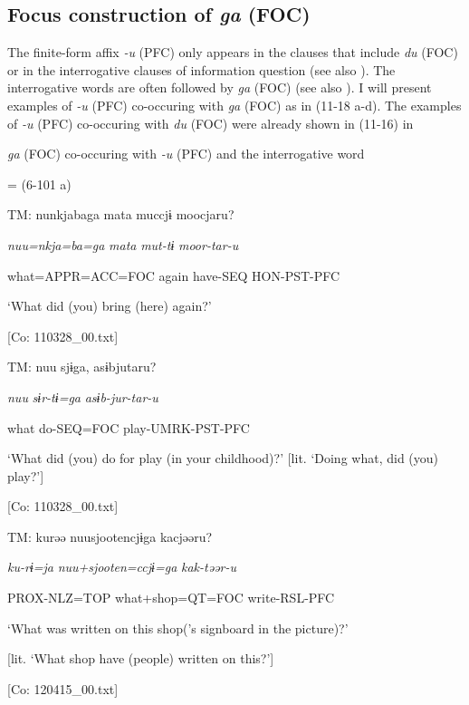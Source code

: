 \subsection{Focus construction of \textit{ga} (FOC)}\label{sec:11.3.2}

The finite-form affix \textit{{}-u} (PFC) only appears in the clauses that include \textit{du} (FOC) or in the interrogative clauses of information question (see also ). The interrogative words are often followed by \textit{ga} (FOC) (see also ). I will present examples of \textit{{}-u} (PFC) co-occuring with \textit{ga} (FOC) as in (11-18 a-d). The examples of \textit{-u} (PFC) co-occuring with \textit{du} (FOC) were already shown in (11-16) in 

\ea\label{ex:11-18}  \textit{ga} (FOC) co-occuring with \textit{{}-u} (PFC) and the interrogative word

  \ea{} = (6-101 a)

    TM:  nunkjabaga  mata  muccjɨ  moocjaru?

      \textit{nuu=nkja=ba=ga}  \textit{mata}  \textit{mut-tɨ}  \textit{moor-tar-u}

      what=APPR=ACC=FOC  again  have-SEQ  HON-PST-PFC

      ‘What did (you) bring (here) again?’

      [Co: 110328\_00.txt]

  \ex  TM:  nuu  sjɨga,  asɨbjutaru?

      \textit{nuu}  \textit{sɨr-tɨ=ga}  \textit{asɨb-jur-tar-u}

      what  do-SEQ=FOC  play-UMRK-PST-PFC

      ‘What did (you) do for play (in your childhood)?’ [lit. ‘Doing what, did (you) play?’]

      [Co: 110328\_00.txt]

  \ex  TM:  kurəə  nuu{\textbar}sjooten{\textbar}cjɨga  kacjəəru?

      \textit{ku-rɨ=ja}  \textit{nuu+sjooten=ccjɨ=ga}  \textit{kak-təər-u}

      PROX-NLZ=TOP  what+shop=QT=FOC  write-RSL-PFC

      ‘What was written on this shop(’s signboard in the picture)?’

[lit. ‘What shop have (people) written on this?’]

      [Co: 120415\_00.txt]

